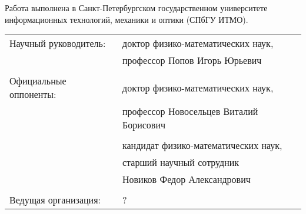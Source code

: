 \documentclass[12pt,a4paper]{article}
\date{}
\theoremstyle{definition}
\theoremstyle{plain}
\begin{document}
\newpage
{}


\thispagestyle{empty}
\addtocounter{page}{1}

\newpage

\thispagestyle{empty}
\noindent 
Работа выполнена в Санкт-Петербургском государственном университете информационных технологий, механики и оптики (СПбГУ ИТМО).

\vspace*{\fill}

\noindent
\begin{tabular}{ll}
Научный руководитель:  & доктор физико-математических наук,  				 \\
                       & профессор Попов Игорь Юрьевич         				 \\
                       & \\
Официальные оппоненты: & доктор физико-математических наук, \\
                       & профессор Новосельцев Виталий Борисович\\
                       & \\
                       & кандидат физико-математических наук,\\
                       & старший научный сотрудник\\
                       & Новиков Федор Александрович\\
                       & \\
Ведущая организация:   & ? \\ %
\end{tabular}
\end{document}

